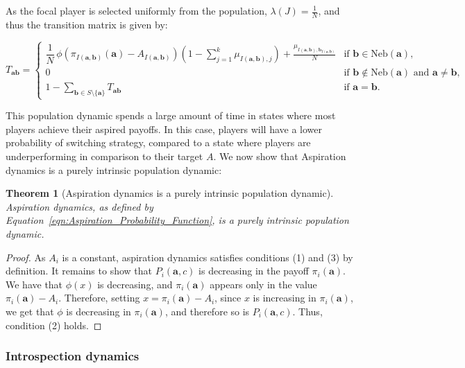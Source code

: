 \documentclass{article}
\newtheorem{theorem}{Theorem}
\begin{document}
As the focal player is selected uniformly from the population, \(\lambda(J) =
\frac{1}{N}\), and thus the transition matrix is given by:

\begin{equation}
T_{\mathbf{ab}} =
\begin{cases}
\dfrac{1}{N} \, \phi(\pi_{I(\mathbf{a}, \mathbf{b})}(\mathbf{a}) - A_{I(\mathbf{a}, \mathbf{b})})\left(1 - \sum_{j=1}^k \mu_{I(\mathbf{a}, \mathbf{b}), j}\right)+ \frac{\mu_{I(\mathbf{a}, \mathbf{b}), \mathbf{b}_{I(\mathbf{a}, \mathbf{b})}}}{N}
    & \text{if } \mathbf{b} \in \mathrm{Neb}(\mathbf{a}),\\[1.2em]
0
    & \text{if } \mathbf{b} \notin \mathrm{Neb}(\mathbf{a}) \text{ and } \mathbf{a} \neq \mathbf{b},\\[0.8em]
1 - \sum_{\mathbf{b} \in S \setminus \{\mathbf{a}\}} T_{\mathbf{ab}} & \text{if } \mathbf{a} = \mathbf{b}.
\end{cases}
\label{eqn:Aspiration_Probability_Function}
\end{equation}

This population dynamic spends a large amount of time in states where most
players achieve their aspired payoffs. In this case, players will have a lower
probability of switching strategy, compared to a state where players are
underperforming in comparison to their target \(A\). We now show that Aspiration
dynamics is a purely intrinsic population dynamic:

\begin{theorem}[Aspiration dynamics is a purely intrinsic population dynamic]
    Aspiration dynamics, as defined by
    Equation~\eqref{eqn:Aspiration_Probability_Function}, is a purely intrinsic
    population dynamic.
\end{theorem}
\begin{proof}
    As \(A_i\) is a constant, aspiration dynamics satisfies conditions (1) and
    (3) by definition. It remains to show that \(P_i(\mathbf{a}, c)\) is
    decreasing in the payoff \(\pi_i(\mathbf{a})\). We have that \(\phi(x)\) is
    decreasing, and \(\pi_i(\mathbf{a})\) appears only in the value
    \(\pi_i(\mathbf{a}) - A_i\). Therefore, setting \(x = \pi_i(\mathbf{a}) -
    A_i\), since \(x\) is increasing in \(\pi_i(\mathbf{a})\), we get that
    \(\phi\) is decreasing in \(\pi_i(\mathbf{a})\), and therefore so is
    \(P_i(\mathbf{a}, c)\). Thus, condition (2) holds.
\end{proof}

\subsubsection{Introspection dynamics}
\end{document}
